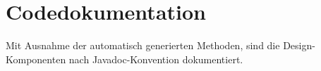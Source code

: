     \section{Codedokumentation}
    
        Mit Ausnahme der automatisch generierten Methoden, sind die
        Design-Komponenten nach Javadoc-Konvention dokumentiert.

%     
%     
% 
% 
% 

